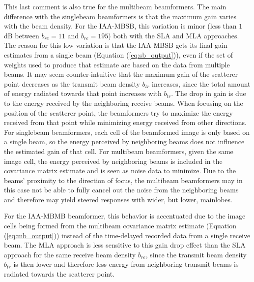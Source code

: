 This last comment is also true for the multibeam beamformers.
The main difference with the singlebeam beamformers is that the maximum gain varies with the beam density.
For the IAA-MBSB, this variation is minor (less than $1~$dB between $b_{re} = 11$ and $b_{re} = 195$) both with the SLA and MLA approaches.
The reason for this low variation is that the IAA-MBSB gets its final gain estimates from a single beam (Equation (\ref{eq:sb_output})), even if the set of weights used to produce that estimate are based on the data from multiple beams.
It may seem counter-intuitive that the maximum gain of the scatterer point decreases as the transmit beam density $b_{tr}$ increases, since the total amount of energy radiated towards that point increases with $b_{tr}$.
The drop in gain is due to the energy received by the neighboring receive beams. When focusing on the position of the scatterer point, the beamformers try to maximize the energy received from that point while minimizing energy received from other directions.
For singlebeam beamformers, each cell of the beamformed image is only based on a single beam, so the energy perceived by neighboring beams does not influence the estimated gain of that cell.
For multibeam beamformers, given the same image cell, the energy perceived by neighboring beams is included in the covariance matrix estimate and is seen as noise data to minimize.
Due to the beams' proximity to the direction of focus, the multibeam beamformers may in this case not be able to fully cancel out the noise from the neighboring beams and therefore may yield steered responses with wider, but lower, mainlobes.

For the IAA-MBMB beamformer, this behavior is accentuated due to the image cells being formed from the multibeam covariance matrix estimate (Equation (\ref{eq:mb_output})) instead of the time-delayed recorded data from a single receive beam.
The MLA approach is less sensitive to this gain drop effect than the SLA approach for the same receive beam density $b_{re}$, since the transmit beam density $b_{tr}$ is then lower and therefore less energy from neighboring transmit beams is radiated towards the scatterer point.


